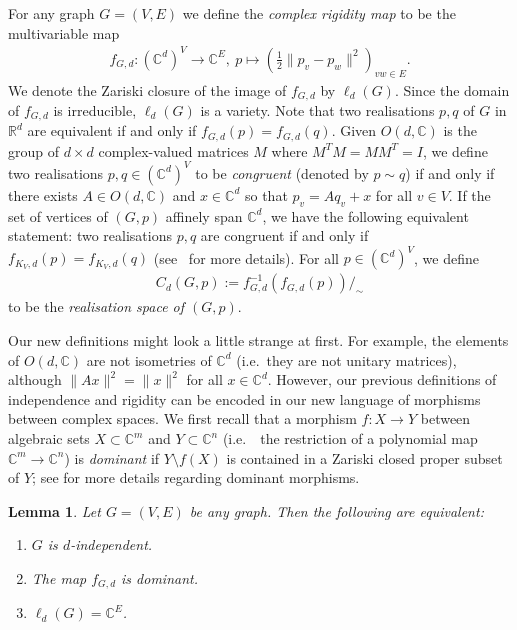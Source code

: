 \documentclass[11pt]{article}
\newtheorem{lemma}[theo]{Lemma}
\theoremstyle{definition}
\providecommand{\ie}{i.e.\ }
\numberwithin{equation}{section}
\begin{document}
For any graph $G=(V,E)$ we define the \emph{complex rigidity map} to be the multivariable map
\begin{align*}
	f_{G,d} : (\mathbb{C}^{d})^V \rightarrow \mathbb{C}^E, ~ p \mapsto \left( \frac{1}{2}\|p_v-p_w\|^2 \right)_{vw \in E}.
\end{align*}
We denote the Zariski closure of the image of $f_{G,d}$ by $\ell_d(G)$.
Since the domain of $f_{G,d}$ is irreducible,
$\ell_d(G)$ is a variety.
Note that two realisations $p,q$ of $G$ in $\mathbb{R}^d$ are equivalent if and only if $f_{G,d}(p)=f_{G,d}(q)$.
Given $O(d, \mathbb{C})$ is the group of $d \times d$ complex-valued matrices $M$ where $M^T M = M M^T = I$,
we define two realisations $p,q \in (\mathbb{C}^{d})^V$ to be \emph{congruent} (denoted by $p \sim q$) if and only if there exists $A \in O(d, \mathbb{C})$ and $x \in \mathbb{C}^{d}$ so that $p_v = Aq_v + x$ for all $v \in V$.
If the set of vertices of $(G,p)$ affinely span $\mathbb{C}^d$,
we have the following equivalent statement:
two realisations $p,q$ are congruent if and only if $f_{K_V,d}(p) = f_{K_V,d}(q)$ (see~\cite[Section 10]{Gortler2014} for more details).
For all $p \in (\mathbb{C}^{d})^V$,
we define 
\begin{align*}
	C_d(G,p) := f^{-1}_{G,d} (f_{G,d}(p))/_\sim
\end{align*}
to be the \emph{realisation space of $(G,p)$}.

Our new definitions might look a little strange at first.
For example,
the elements of $O(d, \mathbb{C})$ are not isometries of $\mathbb{C}^d$ (\ie they are not unitary matrices),
although $\|Ax\|^2 = \|x\|^2$ for all $x \in \mathbb{C}^d$.
However, our previous definitions of independence and rigidity can be encoded in our new language of morphisms between complex spaces.
We first recall that a morphism $f : X \rightarrow Y$ between algebraic sets $X \subset \mathbb{C}^m$ and $Y \subset \mathbb{C}^n$ (\ie~the restriction of a polynomial map $\mathbb{C}^m \rightarrow \mathbb{C}^n$) is \emph{dominant} if $Y \setminus f(X)$ is contained in a Zariski closed proper subset of $Y$;
see  for more details regarding dominant morphisms.


\begin{lemma}\label{l:domind}
	Let $G=(V,E)$ be any graph.
	Then the following are equivalent:
	\begin{enumerate}
		\item \label{l:domind1} $G$ is $d$-independent.
		\item \label{l:domind2} The map $f_{G,d}$ is dominant.
		\item \label{l:domind3} $\ell_d(G) = \mathbb{C}^E$.
	\end{enumerate}
\end{lemma} 
\end{document}
